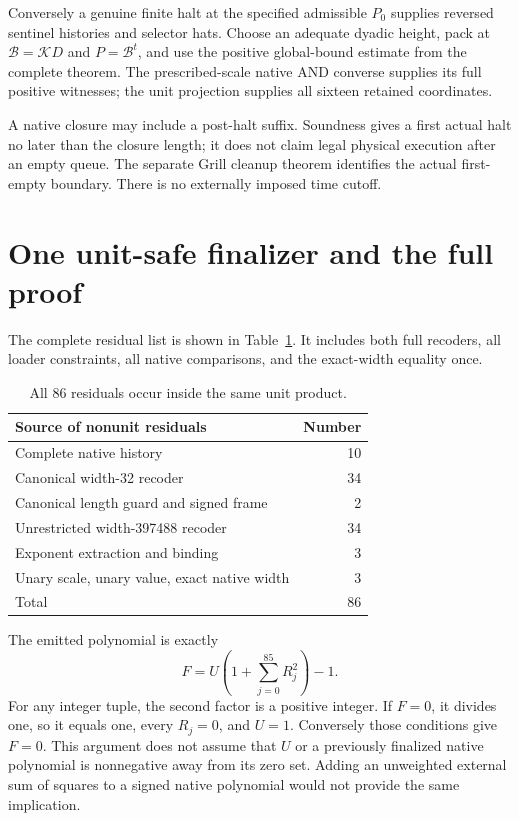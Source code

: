 \documentclass[11pt,letterpaper]{article}
\theoremstyle{definition}\newtheorem{definition}[theorem]{Definition}
\theoremstyle{remark}\newtheorem{remark}[theorem]{Remark}
\begin{document}
Conversely a genuine finite halt at the specified admissible $P_0$ supplies reversed sentinel histories and selector hats. Choose an adequate dyadic height, pack at $\mathcal B=\mathcal K D$ and $P=\mathcal B^t$, and use the positive global-bound estimate from the complete theorem. The prescribed-scale native AND converse supplies its full positive witnesses; the unit projection supplies all sixteen retained coordinates.

A native closure may include a post-halt suffix. Soundness gives a first actual halt no later than the closure length; it does not claim legal physical execution after an empty queue. The separate Grill cleanup theorem identifies the actual first-empty boundary. There is no externally imposed time cutoff.

\section{One unit-safe finalizer and the full proof}
The complete residual list is shown in Table~\ref{fup:gp:tab:residuals}. It includes both full recoders, all loader constraints, all native comparisons, and the exact-width equality once.
\begin{table}[ht]
\centering
\begin{tabular}{lr}
\toprule
Source of nonunit residuals & Number\\\midrule
Complete native history & 10\\
Canonical width-32 recoder & 34\\
Canonical length guard and signed frame & 2\\
Unrestricted width-397488 recoder & 34\\
Exponent extraction and binding & 3\\
Unary scale, unary value, exact native width & 3\\\midrule
Total & 86\\\bottomrule
\end{tabular}
\caption{All 86 residuals occur inside the same unit product.}\label{fup:gp:tab:residuals}
\end{table}

The emitted polynomial is exactly
\begin{equation}\label{fup:gp:eq:finalizer}
 F=U\left(1+\sum_{j=0}^{85}R_j^2\right)-1.
\end{equation}
For any integer tuple, the second factor is a positive integer. If $F=0$, it divides one, so it equals one, every $R_j=0$, and $U=1$. Conversely those conditions give $F=0$. This argument does not assume that $U$ or a previously finalized native polynomial is nonnegative away from its zero set. Adding an unweighted external sum of squares to a signed native polynomial would not provide the same implication.
\end{document}
